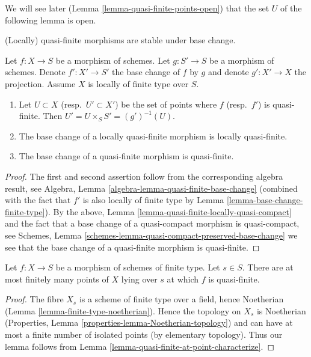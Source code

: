 \noindent
We will see later (Lemma \ref{lemma-quasi-finite-points-open})
that the set $U$ of the following lemma is open.

\begin{lemma}
\label{lemma-base-change-quasi-finite}
\begin{slogan}
(Locally) quasi-finite morphisms are stable under base change.
\end{slogan}
Let $f : X \to S$ be a morphism of schemes.
Let $g : S' \to S$ be a morphism of schemes.
Denote $f' : X' \to S'$ the base change of $f$ by $g$
and denote $g' : X' \to X$ the projection.
Assume $X$ is locally of finite type over $S$.
\begin{enumerate}
\item Let $U \subset X$ (resp.\ $U' \subset X'$)
be the set of points where $f$ (resp.\ $f'$) is quasi-finite.
Then $U' = U \times_S S' = (g')^{-1}(U)$.
\item The base change of a locally quasi-finite morphism is
locally quasi-finite.
\item The base change of a quasi-finite morphism is
quasi-finite.
\end{enumerate}
\end{lemma}

\begin{proof}
The first and second assertion follow from the corresponding
algebra result, see
Algebra, Lemma \ref{algebra-lemma-quasi-finite-base-change}
(combined with the fact that $f'$ is also locally of finite type by
Lemma \ref{lemma-base-change-finite-type}).
By the above, Lemma \ref{lemma-quasi-finite-locally-quasi-compact}
and the fact that a base change of a
quasi-compact morphism is quasi-compact, see
Schemes, Lemma \ref{schemes-lemma-quasi-compact-preserved-base-change}
we see that the base change of a quasi-finite morphism
is quasi-finite.
\end{proof}

\begin{lemma}
\label{lemma-quasi-finite-at-a-finite-number-of-points}
Let $f : X \to S$ be a morphism of schemes of finite type.
Let $s \in S$. There are at most finitely many points
of $X$ lying over $s$ at which $f$ is quasi-finite.
\end{lemma}

\begin{proof}
The fibre $X_s$ is a scheme of finite type over a field,
hence Noetherian (Lemma \ref{lemma-finite-type-noetherian}).
Hence the topology on $X_s$ is Noetherian (Properties, Lemma
\ref{properties-lemma-Noetherian-topology})
and can have at most a finite number of isolated points (by elementary
topology). Thus our lemma follows from
Lemma \ref{lemma-quasi-finite-at-point-characterize}.
\end{proof}


